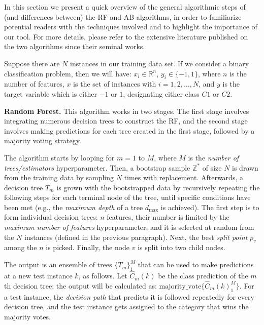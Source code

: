 In this section we present a quick overview of the general algorithmic steps of (and differences between) the RF and AB algorithms, in order to familiarize potential readers with the techniques involved and to highlight the importance of our tool. For more details, please refer to the extensive literature published on the two algorithms since their seminal works.~\cite{Freund1999A,Breiman2001Random} 

Suppose there are $N$ instances in our training data set. If we consider a binary classification problem, then we will have: ${x}_i \in \mathbb{R}^n$, ${y}_i \in \{-1,1\}$, where $n$ is the number of features, $x$ is the set of instances with $i = 1, 2, \dots, N$, and $y$ is the target variable which is either $-1$ or $1$, 
designating either class ${C}1$ or ${C}2$.

\textbf{Random Forest.} This algorithm works in two stages. The first stage involves integrating numerous decision trees to construct the RF, and the second stage involves making predictions for each tree created in the first stage, followed by a majority voting strategy.

The algorithm starts by looping for $m = 1$ to $M$, where $M$ is the \emph{number of trees/estimators} hyperparameter. Then, a bootstrap sample $\mathbb{Z}^*$ of size $N$ is drawn from the training data by sampling $N$ times with replacement. Afterwards, a decision tree $T_m$ is grown with the bootstrapped data by recursively repeating the following steps for each terminal node of the tree, until specific conditions have been met (e.g., the \emph{maximum depth} of a tree $d_{\mathrm{max}}$ is achieved). The first step is to form individual decision trees: $n$ features, their number is limited by the \emph{maximum number of features} hyperparameter, and it is selected at random from the $N$ instances (defined in the previous paragraph). Next, the best \emph{split point} $p_v$ among the $n$ is picked. Finally, the node $v$ is split into two child nodes.

The output is an ensemble of trees $\{T_m\}_1^M$ that can be used to make predictions at a new test instance $k$, as follows. Let $\hat{C}_m(k)$ be the class prediction of the $m$th decision tree; the output will be calculated as: $\text{majority\_vote}\{ \hat{C}_m(k)_1^M \}$. For a test instance, the \emph{decision path} that predicts it is followed repeatedly for every decision tree, and the test instance gets assigned to the category that wins the majority votes.

